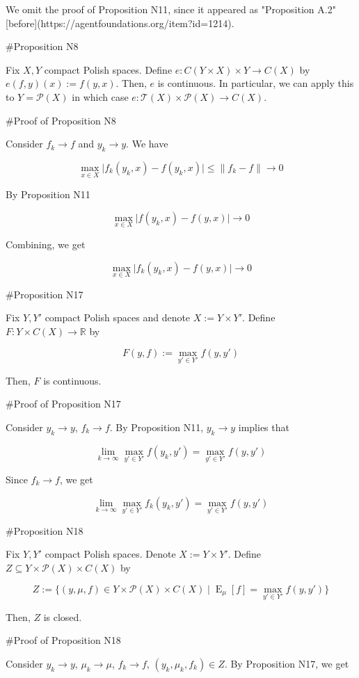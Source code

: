\documentclass[a4paper]{article}
\DeclareMathOperator{\E}{E}
\newcommand{\Reals}{\mathbb{R}}
\newcommand{\Abs}[1]{\lvert #1 \rvert}
\newcommand{\Norm}[1]{\lVert #1 \rVert}
\newcommand{\Prob}{\mathcal{P}}
\newcommand{\T}{\mathcal{T}}
\begin{document}
We omit the proof of Proposition N11, since it appeared as "Proposition A.2" [before](https://agentfoundations.org/item?id=1214).

\#Proposition N8

Fix ${X,Y}$ compact Polish spaces. Define ${e: C(Y \times X) \times Y \rightarrow C(X)}$ by ${e(f,y)(x):=f(y,x)}$. Then, ${e}$ is continuous. In particular, we can apply this to ${Y = \Prob(X)}$ in which case ${e: \T(X) \times \Prob(X) \rightarrow C(X)}$.

\#Proof of Proposition N8

Consider ${f_k \rightarrow f}$ and ${y_k \rightarrow y}$. We have

$$\max_{x \in X} \Abs{f_k(y_k,x)-f(y_k,x)} \leq \Norm{f_k - f} \rightarrow 0$$

By Proposition N11

$$\max_{x \in X} \Abs{f(y_k,x)-f(y,x)} \rightarrow 0$$

Combining, we get

$$\max_{x \in X} \Abs{f_k(y_k,x)-f(y,x)} \rightarrow 0$$

\#Proposition N17

Fix ${Y,Y'}$ compact Polish spaces and denote ${X:=Y \times Y'}$. Define ${F: Y \times C(X) \rightarrow \Reals}$ by 

$${F(y,f):=\max_{y' \in Y'} f(y,y')}$$

Then, ${F}$ is continuous.

\#Proof of Proposition N17

Consider ${y_k \rightarrow y}$, ${f_k \rightarrow f}$. By Proposition N11, ${y_k \rightarrow y}$ implies that

$${\lim_{k \rightarrow \infty} \max_{y' \in Y'} f(y_k,y') = \max_{y' \in Y'} f(y,y')}$$

Since ${f_k \rightarrow f}$, we get

$${\lim_{k \rightarrow \infty} \max_{y' \in Y'} f_k(y_k,y') = \max_{y' \in Y'} f(y,y')}$$

\#Proposition N18

Fix ${Y,Y'}$ compact Polish spaces. Denote ${X:=Y \times Y'}$. Define ${Z \subseteq Y \times \Prob(X) \times C(X)}$ by

$$Z:=\{(y,\mu,f) \in Y \times \Prob(X) \times C(X) \mid \E_\mu[f] = \max_{y' \in Y'} f(y,y')\}$$

Then, ${Z}$ is closed.

\#Proof of Proposition N18

Consider ${y_k \rightarrow y}$, ${\mu_k \rightarrow \mu}$, ${f_k \rightarrow f}$, ${(y_k,\mu_k,f_k) \in Z}$. By Proposition N17, we get
\end{document}
